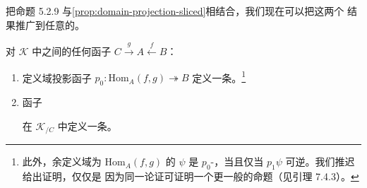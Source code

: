 把命题 5.2.9 与\cref{prop:domain-projection-sliced}相结合，我们现在可以把这两个%
结果推广到任意的\trCommaInfinityCategory。

\begin{corollary}\label{cor:comma-domain-projections}
对\trInfinityCosmos{} $\mathcal{K}$ 中\trInfinityCategory{}之间的任何函子
$C\xrightarrow{\ g\ }A\xleftarrow{\ f\ }B$：
\begin{enumerate}[label=(\roman*)]
\item 定义域投影函子 $p_{0}\colon\mathrm{Hom}_{A}(f,g)\twoheadrightarrow B$
定义一条\trCartesianFibration。\footnote{此外，余定义域为
$\mathrm{Hom}_{A}(f,g)$ 的\trNaturalTransformation{} $\psi$ 是
$p_{0}$-\trCartesian，当且仅当 $p_{1}\psi$ 可逆。我们推迟给出证明，仅仅是%
因为同一论证可证明一个更一般的命题（见引理 7.4.3）。}
\item 函子
\begin{center}
\end{center}
在 $\mathcal{K}_{/C}$ 中定义一条\trDiscreteCartesianFibration。
\end{enumerate}
\end{corollary}


